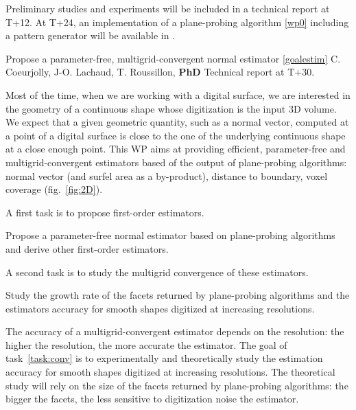 Preliminary studies and experiments will be included in a technical report at T+12.
At T+24, an implementation of a plane-probing algorithm \ref{wp0} including a pattern
generator will be available in \DGtal. 




\medskip
{}
   {Propose a parameter-free, multigrid-convergent normal estimator \ref{goalestim}}
   {C. Coeurjolly, J-O. Lachaud, T. Roussillon, \textbf{PhD}}
   {Technical report at T+30.}
\medskip

Most of the time, when we are working with a digital surface, we are 
interested in the geometry of a continuous shape whose digitization is the input 3D volume.
We expect that a given geometric quantity, such as a normal vector, computed at a point of a digital surface
is close to the one of the underlying continuous shape at a close enough point. 
This WP aims at providing efficient, parameter-free and multigrid-convergent estimators based of
the output of plane-probing algorithms: normal vector (and surfel area as a by-product),
distance to boundary, voxel coverage (fig.~\ref{fig:2D}).

A first task is to propose first-order estimators. 

\begin{Task}
  \label{task:normal}
  Propose a parameter-free normal estimator based on plane-probing algorithms and
  derive other first-order estimators.  
\end{Task}

A second task is to study the multigrid convergence of these estimators. 

\begin{Task}
  \label{task:conv}
  Study the growth rate of the facets returned by plane-probing algorithms
  and the estimators accuracy for smooth shapes digitized at increasing resolutions. 
\end{Task}

The accuracy of a multigrid-convergent estimator depends on the resolution: the higher the resolution,
the more accurate the estimator. The goal of task~\ref{task:conv} is to experimentally and theoretically
study the estimation accuracy for smooth shapes digitized at increasing resolutions. The theoretical study
will rely on the size of the facets returned by plane-probing algorithms: the bigger the facets,
the less sensitive to digitization noise the estimator. 

